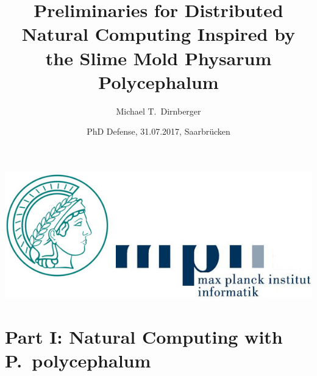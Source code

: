 \documentclass[	hyperref={pdfpagelabels=false}, xcolor=dvipsnames,
		11pt]{beamer}
\title{Preliminaries for Distributed Natural Computing Inspired by the Slime Mold Physarum Polycephalum}
\author{Michael T.\ Dirnberger}
\institute{Max Planck Institute for Informatics}
\date{PhD Defense, 31.07.2017, Saarbr\"ucken\\[2em]}
\begin{document}
\begin{frame}[plain]

\titlepage
\vspace{-1cm}
	    \begin{center}
		\includegraphics[width=0.3\linewidth]{./pics/mpilogo}
	    \end{center}
\end{frame} 


\section{Part I: Natural Computing with P.~polycephalum}
\end{document}
